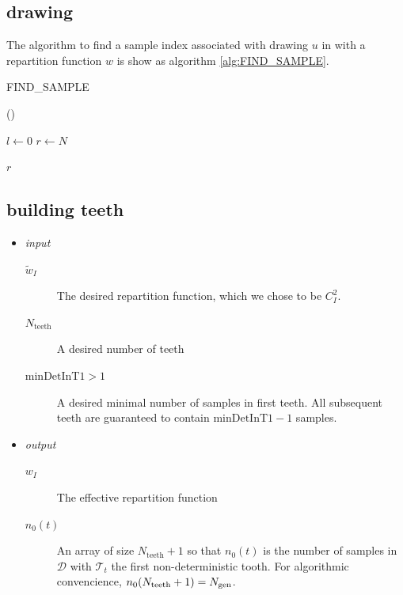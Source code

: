 \documentclass[./thesis.tex]{subfiles}
\newcommand{\minDetInT}{\text{minDetInT1}}
\newcommand{\Nteeth}{N_\text{teeth}}
\begin{document}
\subsection{drawing}

The algorithm to find a sample index associated with drawing $u$ in with a repartition function $w$ is show as algorithm \ref{alg:FIND_SAMPLE}.

\begin{algorithm}
\label{alg:FIND_SAMPLE}
\caption{FIND\_SAMPLE}
	
	\Fn(){}{
		
		$l \gets 0$ \;
		$r \gets N$ \;
		
		\KwRet $r$ \;
	}
\end{algorithm}




\subsection{building teeth}

\begin{itemize}

\item
\emph{input}
\begin{description}
\item[$\tilde w_I$]
The desired repartition function, which we chose to be $C_I^2$.
\item[$\Nteeth$]
A desired number of teeth
\item[$\minDetInT > 1$]
A desired minimal number of samples in first teeth. All subsequent teeth are guaranteed to contain $\minDetInT-1$ samples.
\end{description}

\item
\emph{output}
\begin{description}
\item[$w_I$]
The effective repartition function
\item[$n_0(t)$]
An array of size $\Nteeth+1$ so that $n_0(t)$ is the number of samples in $\mathcal{D}$ with $\mathcal{T}_t$ the first non-deterministic tooth. For algorithmic convencience, $n_0(\Nteeth+1)=\Ngen$.
\end{description}
\end{itemize}
\end{document}
